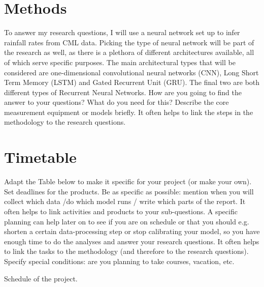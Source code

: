 \documentclass[twocolumn, 10pt, a4paper]{article}
\begin{document}
	\section{Methods}
	
	To answer my research questions, I will use a neural network set up to infer rainfall rates from CML data. Picking the type of neural network will be part of the research as well, as there is a plethora of different architectures available, all of which serve specific purposes. 
	The main architectural types that will be considered are one-dimensional convolutional neural networks (CNN), Long Short Term Memory (LSTM) and Gated Recurrent Unit (GRU). The final two are both different types of Recurrent Neural Networks. 
	How are you going to find the answer to your questions? What do you need for this? Describe the core measurement equipment or models briefly. It often helps to link the steps in the methodology to the research questions.
	
	
	\section{Timetable}
	
	Adapt the Table below to make it specific for your project (or make your own). Set deadlines for the products. Be as specific as possible: mention when you will collect which data /do which model runs / write which parts of the report. It often helps to link activities and products to your sub-questions. A specific planning can help later on to see if you are on schedule or that you should e.g. shorten a certain data-processing step or stop calibrating your model, so you have enough time to do the analyses and answer your research questions. It often helps to link the tasks to the methodology (and therefore to the research questions). Specify special conditions: are you planning to take courses, vacation, etc. 
	
	
	\begin{table*}[t]
		\caption{Schedule of the project.}
		\label{tab:schedule}
	\end{table*}
	
	
	
	
	
	
	
	
	
	
	
	
	
\end{document}

